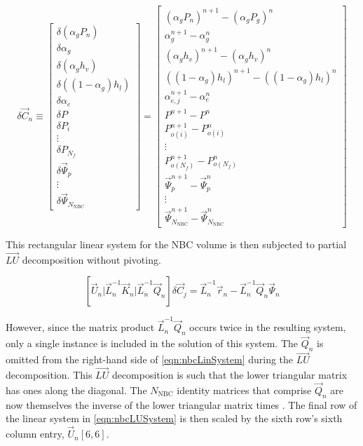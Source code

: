 \begin{equation}
\label{eqn:nbcUpdate}
\delta \vec{C}_{n} \equiv 
\begin{bmatrix}
\delta ( \alpha_{g} P_{n} ) \\
\delta \alpha_{g} \\
\delta ( \alpha_{g} h_v ) \\
\delta ( (1 - \alpha_{g} ) h_l ) \\
\delta \alpha_{e} \\
\delta P \\ 
\delta P_i \\
\vdots \\
\delta P_{N_{f}} \\
\delta \vec{\Psi}_{p} \\
\vdots \\
\delta \vec{\Psi}_{N_{\text{NBC}}}
\end{bmatrix}
=
\begin{bmatrix}
( \alpha_{g} P_{n})^{n+1} - (\alpha_{g} P_{g} )^{n} \\
\alpha^{n+1}_{g} - \alpha^{n}_{g} \\
( \alpha_{g} h_{v} )^{n+1} - ( \alpha_{g} h_{v} )^{n} \\
( ( 1 - \alpha_{g} ) h_{l} )^{n+1} - ( ( 1 - \alpha_{g} ) h_{l} )^{n} \\
\alpha^{n+1}_{e,j} - \alpha^{n}_{e} \\
 P^{n+1} - P^{n} \\
 P_{o(i)}^{n+1} - P_{o(i)}^{n} \\
 \vdots \\
 P_{o(N_{f})}^{n+1} - P_{o(N_{f})}^{n} \\
 \vec{\Psi}_{p}^{n+1} - \vec{\Psi}_{p}^{n} \\
 \vdots \\
 \vec{\Psi}_{N_{\text{NBC}}}^{n+1} - \vec{\Psi}_{N_{\text{NBC}}}^{n}
\end{bmatrix}
\end{equation}

This rectangular linear system for the NBC volume is then subjected to partial $\vec{LU}$ decomposition without pivoting.

\begin{equation}
\label{eqn:nbcLUSystem}
\left[ \vec{U}_{n} \vert \vec{L}^{-1}_{n}\vec{K}_{n} \vert \vec{L}^{-1}_{n}\vec{Q}_{n} \right] \delta \vec{C}_{j} = \vec{L}^{-1}_{n}\vec{r}_{n}  -\vec{L}^{-1}_{n}\vec{Q}_{n}\vec{\Psi}_{n}
\end{equation}

However, since the matrix product $\vec{L}_{n}^{-1}\vec{Q}_{n}$ occurs twice in the resulting system, only a single instance is included in the solution of this system.
The $\vec{Q}_{n}$ is omitted from the right-hand side of \eqref{eqn:nbcLinSystem} during the $\vec{LU}$ decomposition.
This $\vec{LU}$ decomposition is such that the lower triangular matrix has ones along the diagonal.
The $N_{\text{NBC}}$ identity matrices that comprise $\vec{Q}_{n}$ are now themselves the inverse of the lower triangular matrix times \dt{}.
The final row of the linear system in \eqref{eqn:nbcLUSystem} is then scaled by the sixth row's sixth column entry, $\vec{U}_{n}[6,6]$.

